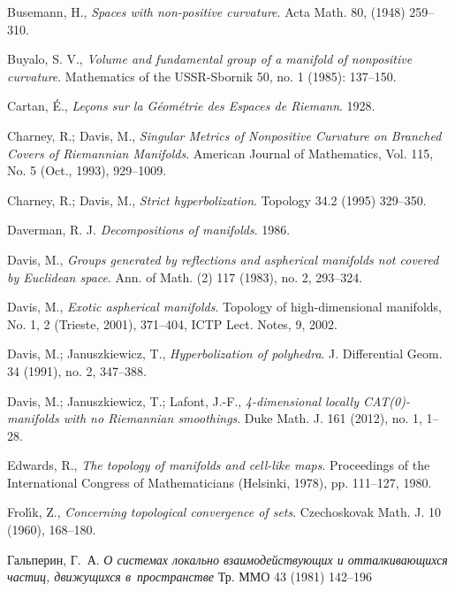 \begin{thebibliography}{52}
Busemann, H., 
\textit{Spaces with non-positive curvature}.
Acta Math. 
80, 
(1948) 
259--310.

Buyalo, S. V.,
\textit{Volume and fundamental group of a manifold of nonpositive curvature}.
Mathematics of the USSR-Sbornik 50, no. 1 (1985): 137--150.

Cartan, \'E.,
\textit{Le\c{c}ons sur la G\'eom\'etrie des Espaces de Riemann}. 1928.

Charney, R.;
Davis, M.,
\textit{Singular Metrics of Nonpositive Curvature on Branched Covers of Riemannian Manifolds}.
American Journal of Mathematics, 
Vol. 115, 
No. 5 
(Oct., 1993), 
929--1009.

Charney, R.; Davis, M., 
\textit{Strict hyperbolization}.
Topology 
34.2 
(1995) 
329--350.

Daverman, R. J.
\textit{Decompositions of manifolds}. 1986.

Davis, M., 
\textit{Groups generated by reflections and aspherical manifolds not covered by Euclidean space}.
Ann. of Math. 
(2) 117 
(1983), 
no. 2, 
293--324. 

Davis, M.,
\textit{Exotic aspherical manifolds}.
Topology of high-dimensional manifolds, 
No. 1, 2 (Trieste, 2001), 371--404, ICTP Lect. Notes, 9, 2002.



Davis, M.; 
Januszkiewicz, T., 
\textit{Hyperbolization of polyhedra}. 
J. Differential Geom. 
34 
(1991), 
no. 2, 
347--388.

Davis, M.; 
Januszkiewicz, T.; 
Lafont, J.-F.,
\textit{4-dimensional locally CAT(0)-manifolds with no Riemannian smoothings}. 
Duke Math. J. 
161 
(2012), 
no. 1, 
1--28.

Edwards, R.,
\textit{The topology of manifolds and cell-like maps}.
Proceedings of the International Congress of Mathematicians (Helsinki, 1978), pp. 111--127, 1980.

Frol\'{\i}k, Z., 
\textit{Concerning topological convergence of sets}.
Czechoskovak Math. J. 
10 
(1960), 
168--180.

\begin{otherlanguage}{russian} 
Гальперин, Г.~А.
\textit{О системах локально взаимодействующих и отталкивающихся частиц, движущихся в~пространстве}
Тр. ММО
43
(1981)
142--196
\end{otherlanguage}


\end{thebibliography}
